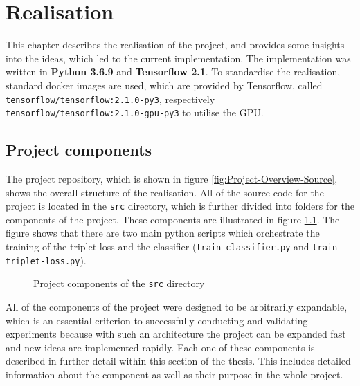 \chapter{Realisation}
\label{ch:Realisation}
This chapter describes the realisation of the project, and provides some insights into the ideas, which led to the current implementation. The implementation was written in \textbf{Python 3.6.9} and \textbf{Tensorflow 2.1}. To standardise the realisation, standard docker images are used, which are provided by Tensorflow, called \texttt{tensorflow/tensorflow:2.1.0-py3}, respectively \texttt{tensorflow/tensorflow:2.1.0-gpu-py3} to utilise the GPU.

\section{Project components}
\label{sec:Project-Components}
The project repository, which is shown in figure \ref{fig:Project-Overview-Source}, shows the overall structure of the realisation. All of the source code for the project is located in the \texttt{src} directory, which is further divided into folders for the components of the project. These components are illustrated in figure \ref{sec:Project-Components}. The figure shows that there are two main python scripts which orchestrate the training of the triplet loss and the classifier (\texttt{train-classifier.py} and \texttt{train-triplet-loss.py}). 

\begin{figure}[ht]
\caption{Project components of the \texttt{src} directory}
\label{fig:Project-Components}
\end{figure}
\noindent
All of the components of the project were designed to be arbitrarily expandable, which is an essential criterion to successfully conducting and validating experiments because with such an architecture the project can be expanded fast and new ideas are implemented rapidly.
\newline
\newline
Each one of these components is described in further detail within this section of the thesis. This includes detailed information about the component as well as their purpose in the whole project.

